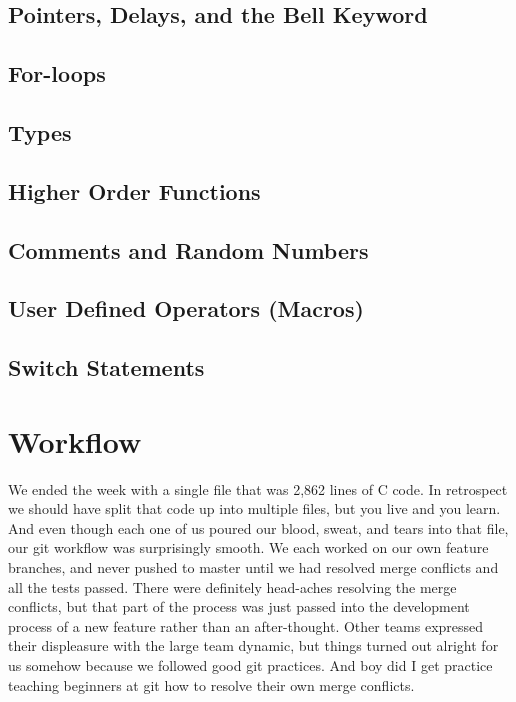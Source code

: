 \documentclass[12pt]{article}
\begin{document}
      \subsection{Pointers, Delays, and the Bell Keyword}

      \subsection{For-loops}

      \subsection{Types}

      \subsection{Higher Order Functions}

      \subsection{Comments and Random Numbers}

      \subsection{User Defined Operators (Macros)}

      \subsection{Switch Statements}


    \section{Workflow}

      We ended the week with a single file that was 2,862 lines of C code. In retrospect we should have split that code up into multiple files, but you live and you learn. And even though each one of us poured our blood, sweat, and tears into that file, our git workflow was surprisingly smooth. We each worked on our own feature branches, and never pushed to master until we had resolved merge conflicts and all the tests passed. There were definitely head-aches resolving the merge conflicts, but that part of the process was just passed into the development process of a new feature rather than an after-thought. Other teams expressed their displeasure with the large team dynamic, but things turned out alright for us somehow because we followed good git practices. And boy did I get practice teaching beginners at git how to resolve their own merge conflicts. 
\end{document}
